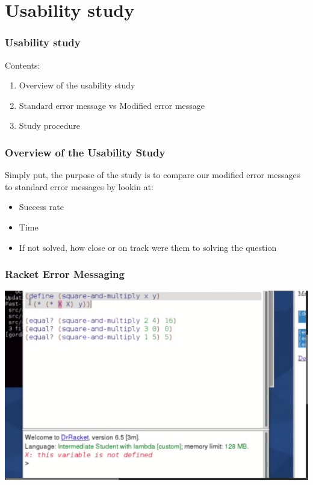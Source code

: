 \documentclass{beamer}
\begin{document}
\section{Usability study}

\begin{frame}
  \frametitle{Usability study}
Contents:
\begin{enumerate}
\item Overview of the usability study 
\item Standard error message vs Modified error message
\item Study procedure
\end{enumerate}
\end{frame}


\begin{frame}
  \frametitle{Overview of the Usability Study}
Simply put, the purpose of the study is to compare our modified error messages to standard error messages by lookin at:
\begin{itemize}
\item Success rate
\item Time
\item If not solved, how close or on track were them to solving the question
\end{itemize} 
\end{frame}

\begin{frame}
  \frametitle{Racket Error Messaging}
  \includegraphics[scale=.17]{R2Rshot}
\end{frame}
\end{document}
